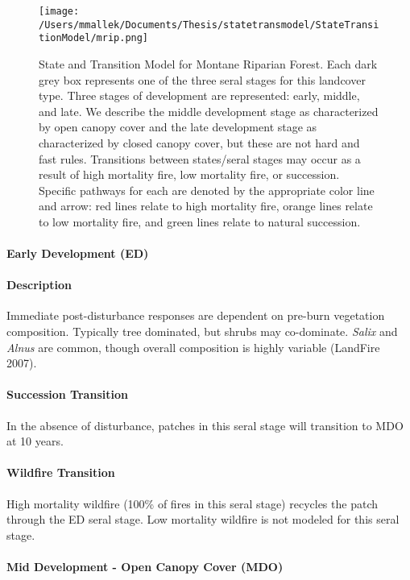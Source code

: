 \begin{figure}[htbp]
\centering
\texttt{[image: /Users/mmallek/Documents/Thesis/statetransmodel/StateTransitionModel/mrip.png]}
\caption{State and Transition Model for Montane Riparian Forest. Each dark grey box represents one of the three seral stages for this landcover type. Three stages of development are represented: early, middle, and late. We describe the middle development stage as characterized by open canopy cover and the late development stage as characterized by closed canopy cover, but these are not hard and fast rules. Transitions between states/seral stages may occur as a result of high mortality fire, low mortality fire, or succession. Specific pathways for each are denoted by the appropriate color line and arrow: red lines relate to high mortality fire, orange lines relate to low mortality fire, and green lines relate to natural succession.} 
\label{mrip_transmodel}
\end{figure}



\paragraph{Early Development (ED)}

\paragraph{Description} Immediate post-disturbance responses are dependent on pre-burn vegetation composition. Typically tree dominated, but shrubs may co-dominate. \emph{Salix} and \emph{Alnus} are common, though overall composition is highly variable (LandFire 2007).

\paragraph{Succession Transition} In the absence of disturbance, patches in this seral stage will transition to MDO at 10 years.

\paragraph{Wildfire Transition} High mortality wildfire (100\% of fires in this seral stage) recycles the patch through the ED seral stage. Low mortality wildfire is not modeled for this seral stage.

\noindent\hrulefill


\paragraph{Mid Development - Open Canopy Cover (MDO)}

